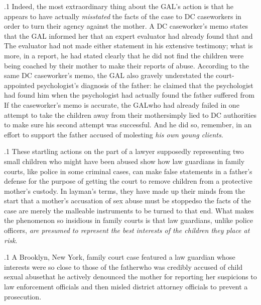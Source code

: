 \documentclass[11pt, twoside]{article}
\begin{document}
{\p.1{%
Indeed, the most extraordinary thing about the GAL’s action is that
he appears to have actually \textit{misstated} the facts of the case to DC
caseworkers in order to turn their agency against the mother. A
DC caseworker’s memo states that the GAL informed her that an expert
evaluator had already found that  and  The evaluator had not made either
statement in his extensive testimony; what is more, in a report, he had
stated clearly that he did not find the children were being coached
by their mother to make their reports of abuse. According to the
same DC caseworker’s memo, the GAL also gravely understated the
court-appointed psychologist’s diagnosis of the father: he claimed that the
psychologist had found him  when the psychologist had actually found the father suffered from  If the caseworker’s memo is accurate, the
GAL\mdash{}who had already failed in one attempt to take the children away
from their mother\mdash{}simply lied to DC authorities to make sure his second
attempt was successful. And he did so, remember, in an effort to support
the father accused of molesting \textit{his own young clients}.
}%

\p.1{%
These startling actions on the part of a lawyer supposedly representing two small children who might have been abused show how law
guardians in family courts, like police in some criminal cases, can make
false statements in a father’s defense for the  purpose of
getting the court to remove children from a protective mother’s custody. In layman’s terms, they have made up their minds from the start
that a mother’s accusation of sex abuse must be stopped\mdash{}so the facts
of the case are merely the malleable instruments to be turned to that
end. What makes the phenomenon so insidious in family courts is that
law guardians, unlike police officers, \textit{are presumed to represent the best
interests of the children they place at risk}.
}%

\p.1{%
A Brooklyn, New York, family court case featured a law guardian
whose interests were so close to those of the father\mdash{}who was credibly
accused of child sexual abuse\mdash{}that he actively denounced the mother
for reporting her suspicions to law enforcement officials and then misled
district attorney officials to prevent a prosecution.
}%

}
\end{document}
